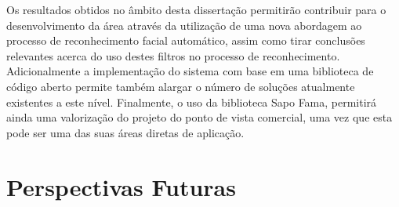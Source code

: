 Os resultados obtidos no âmbito desta dissertação permitirão contribuir para o desenvolvimento da área através da utilização de uma nova abordagem ao processo de reconhecimento facial automático, assim como tirar conclusões relevantes acerca do uso destes filtros no processo de reconhecimento. Adicionalmente a implementação do sistema com base em uma biblioteca de código aberto permite também alargar o número de soluções atualmente existentes a este nível. Finalmente, o uso da biblioteca Sapo Fama, permitirá ainda uma valorização do projeto  do ponto de vista comercial, uma vez que esta pode ser uma das suas áreas diretas de aplicação.

\section{Perspectivas Futuras}